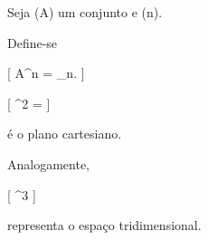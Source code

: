 \documentclass[../../main]{subfiles}
\begin{document}
\begin{defn}
	\label{def:matematica:teoria-conjuntos:produto-cartesiano:potencia-cartesiana}

	Seja (A) um conjunto e (n\in{}).

	Define-se

	[
	A^n
	=
	_{n}.
	]

\end{defn}

\begin{ex}

	[
		^2
		=
		\times{}
	]

	é o plano cartesiano.

	Analogamente,

	[
			^3
		]

	representa o espaço tridimensional.

\end{ex}
\end{document}
